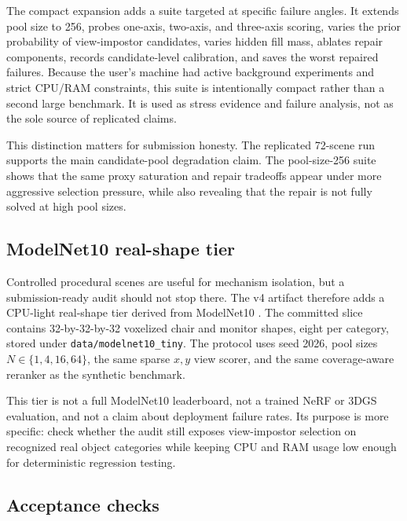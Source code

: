 \documentclass{article}
\begin{document}
The compact expansion adds a suite targeted at specific failure angles. It
extends pool size to 256, probes one-axis, two-axis, and three-axis scoring,
varies the prior probability of view-impostor candidates, varies hidden fill
mass, ablates repair components, records candidate-level calibration, and saves
the worst repaired failures. Because the user's machine had active background
experiments and strict CPU/RAM constraints, this suite is intentionally compact
rather than a second large benchmark. It is used as stress evidence and failure
analysis, not as the sole source of replicated claims.

This distinction matters for submission honesty. The replicated 72-scene run
supports the main candidate-pool degradation claim. The pool-size-256 suite
shows that the same proxy saturation and repair tradeoffs appear under more
aggressive selection pressure, while also revealing that the repair is not
fully solved at high pool sizes.

\subsection{ModelNet10 real-shape tier}

Controlled procedural scenes are useful for mechanism isolation, but a
submission-ready audit should not stop there. The v4 artifact therefore adds a
CPU-light real-shape tier derived from ModelNet10 \cite{wu20153d}. The
committed slice contains 32-by-32-by-32 voxelized chair and monitor shapes,
eight per category, stored under \texttt{data/modelnet10\_tiny}. The protocol
uses seed 2026, pool sizes $N\in\{1,4,16,64\}$, the same sparse $x,y$ view
scorer, and the same coverage-aware reranker as the synthetic benchmark.

This tier is not a full ModelNet10 leaderboard, not a trained NeRF or 3DGS
evaluation, and not a claim about deployment failure rates. Its purpose is
more specific: check whether the audit still exposes view-impostor selection
on recognized real object categories while keeping CPU and RAM usage low enough
for deterministic regression testing.

\subsection{Acceptance checks}
\end{document}
